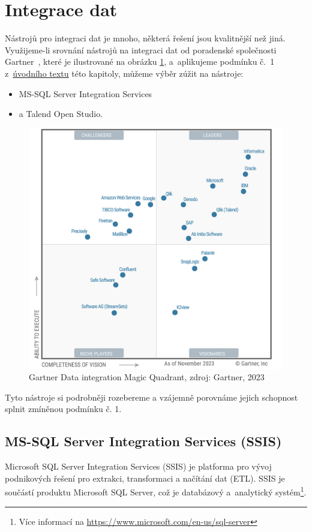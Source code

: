 \section{Integrace dat}\label{sec:DatInteg}

Nástrojů pro integraci dat je mnoho, některá řešení jsou kvalitnější než jiná.
Využijeme-li srovnání nástrojů na integraci dat od poradenské společnosti Gartner~\cite{FIG:DatInteg}, které je ilustrované na obrázku \ref{fig:datInteg}, a~aplikujeme podmínku č.~1 z~\hyperref[chap:analysis]{úvodního textu} této kapitoly, můžeme výběr zúžit na nástroje:
\begin{itemize}
    \item MS-SQL Server Integration Services
    \item a Talend Open Studio.
\end{itemize}

\begin{figure}
    \centering
    \includegraphics[width=0.65\linewidth]{img/gartner-data-integration.png}
    \caption{Gartner Data integration Magic Quadrant, zdroj: Gartner, 2023}
    \label{fig:datInteg}
\end{figure}

Tyto nástroje si podrobněji rozebereme a vzájemně porovnáme jejich schopnost splnit zmíněnou podmínku č. 1.

\subsection{MS-SQL Server Integration Services (SSIS)}

Microsoft SQL Server Integration Services (SSIS) je platforma pro vývoj podnikových řešení pro extrakci, transformaci a načítání dat (ETL). SSIS je součástí produktu Microsoft SQL Server, což je databázový a~analytický systém\footnote{Více informací na \url{https://www.microsoft.com/en-us/sql-server}}.

